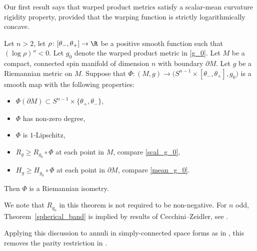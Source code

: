 Our first result says that warped product metrics satisfy a scalar-mean curvature rigidity property, provided that the warping function is strictly logarithmically concave.

\begin{theorem} \label{spherical_band}
Let $n>2$, let $\rho\colon [\theta_- , \theta_+] \to \R$ be a positive smooth function such that ${(\log \rho)''<0}$.
Let $g_0$ denote the warped product metric in \eqref{g_0}.
Let $M$ be a compact, connected spin manifold of dimension $n$ with boundary $\partial M$.
Let $g$ be a Riemannian metric on $M$.
Suppose that $\Phi\colon (M,g) \to \big(S^{n-1} \times [\theta_-,\theta_+],g_0\big)$ is a smooth map with the following properties:
\begin{itemize}\itemsep=0pt
\item $\Phi(\partial M) \subset S^{n-1} \times \{\theta_+,\theta_-\}$,
\item $\Phi$ has non-zero degree,
\item $\Phi$ is $1$-Lipschitz,
\item $R_g \geq R_{g_0} \circ \Phi$ at each point in $M$, compare \eqref{scal_g_0},
\item $H_g \geq H_{g_0} \circ \Phi$ at each point in $\partial M$, compare \eqref{mean_g_0}.
\end{itemize}
Then $\Phi$ is a Riemannian isometry.
\end{theorem}

We note that $R_{g_0}$ in this theorem is not required to be non-negative.
For $n$ odd, Theorem~\ref{spherical_band} is implied by results of Cecchini--Zeidler, see \cite[Theorem~10.2]{Cecchini-Zeidler}.

Applying this discussion to annuli in simply-connected space forms as in \cite[Section~10]{Cecchini-Zeidler}, this removes the parity restriction in \cite[Corollaries~10.4 and~10.5]{Cecchini-Zeidler}.

